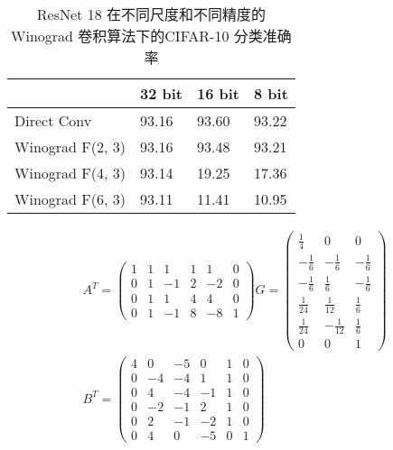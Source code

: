 \begin{table}[]
\centering
\caption{ResNet 18 在不同尺度和不同精度的Winograd 卷积算法下的CIFAR-10 分类准确率}
\begin{tabular}{llll}
\hline
\multicolumn{1}{|l|}{}                 & \multicolumn{1}{l|}{32 bit} & \multicolumn{1}{l|}{16 bit} & \multicolumn{1}{l|}{8 bit} \\ \hline
\multicolumn{1}{|l|}{Direct  Conv}     & \multicolumn{1}{l|}{93.16}  & \multicolumn{1}{l|}{93.60}  & \multicolumn{1}{l|}{93.22} \\ \hline
\multicolumn{1}{|l|}{Winograd F(2, 3)} & \multicolumn{1}{l|}{93.16}  & \multicolumn{1}{l|}{93.48}  & \multicolumn{1}{l|}{93.21} \\ \hline
\multicolumn{1}{|l|}{Winograd F(4, 3)} & \multicolumn{1}{l|}{93.14}  & \multicolumn{1}{l|}{19.25}  & \multicolumn{1}{l|}{17.36} \\ \hline
\multicolumn{1}{|l|}{Winograd F(6, 3)} & \multicolumn{1}{l|}{93.11}  & \multicolumn{1}{l|}{11.41}  & \multicolumn{1}{l|}{10.95} \\ \hline
\end{tabular}
\label{tbl:winograd_acc}
\end{table}
\begin{align}
\label{eq:winograd_f43}
  A^T = 
  \begin{pmatrix}
      1 & 1 & 1 &  1 &  1 &  0\\
      0 & 1 & -1&  2 &  -2&  0\\
      0 & 1 & 1 &  4 &  4 &  0\\
      0 & 1 & -1&  8 &  -8&  1
  \end{pmatrix}
  G = 
  \begin{pmatrix}
    \frac{1}{4} & 0 & 0 \\
    -\frac{1}{6} & -\frac{1}{6} & -\frac{1}{6} \\
    -\frac{1}{6} & \frac{1}{6} & -\frac{1}{6} \\
    \frac{1}{24} & \frac{1}{12} & \frac{1}{6} \\
    \frac{1}{24} & -\frac{1}{12} & \frac{1}{6} \\
    0 & 0 & 1
  \end{pmatrix}\\
  B^T =
  \begin{pmatrix}
    4  & 0 &  -5 & 0  &  1&  0\\
    0  & -4&  -4 & 1  &  1&  0\\
    0  & 4 &  -4 & -1 &  1&  0\\
    0  & -2&  -1 & 2  &  1&  0\\
    0  & 2 &  -1 & -2 &  1&  0\\
    0  & 4 &  0  & -5 &  0&  1
  \end{pmatrix}
\end{align}

